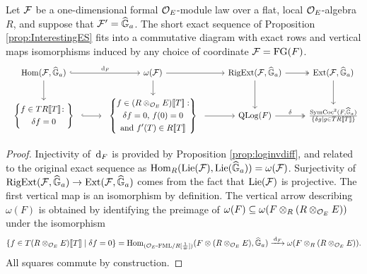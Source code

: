 \documentclass[../main.tex]{subfiles}
\begin{document}
\begin{prop} \label{prop:ExplicitInterestingES}
  Let $\mathcal{F}$ be a one-dimensional formal $\mathcal{O}_E$-module law over a flat, local
  $\mathcal{O}_E$-algebra $R$, and suppose that $\mathcal{F}' = \widehat{\mathbb{G}}_a$.
  The short exact sequence of Proposition \ref{prop:InterestingES}
  fits into a commutative diagram with 
  exact rows and vertical maps isomorphisms induced by 
  any choice of coordinate $\mathcal{F} = \textnormal{FG}(F)$.
\begin{equation*}
\begin{tikzcd}[ampersand replacement=\&]
  {\Hom(\cF,\Ghat_a)} \& {\omega(\cF)} \& {\RigExt(\cF,\Ghat_a)} \&
  {\Ext(\cF,\Ghat_a)} \\ 
  \begin{array}{c} \left\{\begin{gathered} f \in TR\llbr T \rrbr \colon  \\  \delta f
    = 0\end{gathered}  \right\} \end{array} \& \begin{array}{c}
    \left\{\begin{gathered} f \in (R\otimes_{\cO_E} E)\llbr T \rrbr : \\ 
  \text{$\delta f = 0$, $f(0) = 0$} \\
    \text{and $f'(T) \in R\llbr T \rrbr$}\end{gathered} \right\} \end{array} \& {\QLog(F)} \&
    {\frac{\SymCoc^2(F, \Ghat_a)}{\{\delta g \mid g \in T R\llbr T \rrbr\}}}
	\arrow[hook, "{\dc_F}", from=1-1, to=1-2]
	\arrow[from=1-1, to=2-1]
	\arrow[from=1-2, to=1-3]
	\arrow[from=1-2, to=2-2]
	\arrow[two heads, from=1-3, to=1-4]
	\arrow[from=1-3, to=2-3]
	\arrow[from=1-4, to=2-4]
	\arrow[hook, from=2-1, to=2-2]
	\arrow[from=2-2, to=2-3]
	\arrow["\delta", two heads, from=2-3, to=2-4]
\end{tikzcd}
\end{equation*}
\begin{proof}
  Injectivity of $\, \mathrm{d}_F$ is provided by Proposition \ref{prop:loginvdiff},
  and related to the original exact sequence as $\operatorname{Hom}_R(\operatorname{Lie}(\mathcal{F}), \operatorname{Lie}(\widehat{\mathbb{G}}_a)) = 
  \omega(\mathcal{F})$.
  Surjectivity of $\operatorname {RigExt}(\mathcal{F}, \widehat{\mathbb{G}}_a) \to \operatorname{Ext}(\mathcal{F}, \widehat{\mathbb{G}}_a)$ comes from the
  fact that $\operatorname{Lie}(\mathcal{F})$ is projective. 
  The first vertical map is an isomorphism by definition. 
  The vertical arrow describing $\omega(F)$ is obtained by
  identifying the preimage of $\omega(F) \subseteq \omega(F \otimes_R (R
  \otimes_{\mathcal{O}_E}E))$ under the isomorphism 
  \begin{equation*}
    \{f \in T(R \otimes_{\mathcal{O}_E} E)\llbracket T \rrbracket \mid \delta f = 0\} =
    \operatorname{Hom}_{{({\mathcal{O}_E}\textnormal-\allowbreak\mathrm{FML}/{R[\frac 1\varpi]})}} (F \otimes (R \otimes_{\mathcal{O}_E}
    E), \widehat{\mathbb{G}}_a) \xrightarrow{\, \mathrm{d}_F} \omega(F \otimes_R (R \otimes_{\mathcal{O}_E}E)).
  \end{equation*}
  All squares commute by construction.
\end{proof}
\end{prop}
\end{document}
